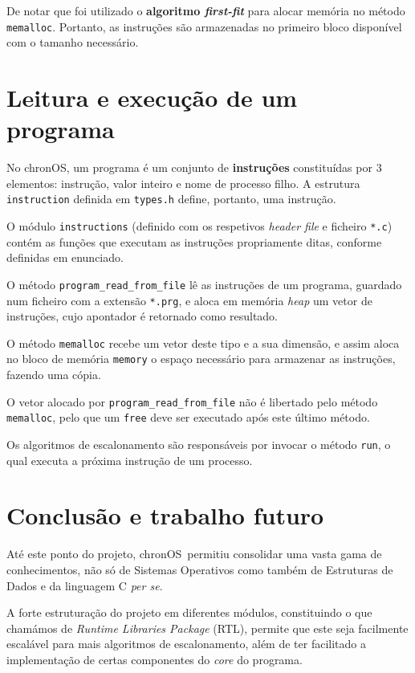 \documentclass[a4paper,11pt,onecolumn,oneside]{article}
\newcommand{\chronOS}{\textsf{chronOS}}
\begin{document}
	De notar que foi utilizado o \textbf{algoritmo \textit{first-fit}} para alocar memória no método \verb|memalloc|. Portanto, as instruções são armazenadas no primeiro bloco disponível com o tamanho necessário.
	
	
	\section{Leitura e execução de um programa}
	\label{sec:program}
	
	No \chronOS, um programa é um conjunto de \textbf{instruções} constituídas por 3 elementos: instrução, valor inteiro e nome de processo filho. A estrutura \verb|instruction| definida em \verb|types.h| define, portanto, uma instrução.
	
	O módulo \texttt{instructions} (definido com os respetivos \textit{header file} e ficheiro \verb|*.c|) contém as funções que executam as instruções propriamente ditas, conforme definidas em enunciado.
	
	O método \verb|program_read_from_file| lê as instruções de um programa, guardado num ficheiro com a extensão \verb|*.prg|, e aloca em memória \textit{heap} um vetor de instruções, cujo apontador é retornado como resultado.
	
	O método \verb|memalloc| recebe um vetor deste tipo e a sua dimensão, e assim aloca no bloco de memória \verb|memory| o espaço necessário para armazenar as instruções, fazendo uma cópia.
	
	O vetor alocado por \verb|program_read_from_file| não é libertado pelo método \verb|memalloc|, pelo que um \verb|free| deve ser executado após este último método.
	
	Os algoritmos de escalonamento são responsáveis por invocar o método \verb|run|, o qual executa a próxima instrução de um processo.
	
	
	\section{Conclusão e trabalho futuro}
	\label{sec:con_futwork}
	
	Até este ponto do projeto, \chronOS~permitiu consolidar uma vasta gama de conhecimentos, não só de Sistemas Operativos como também de Estruturas de Dados e da linguagem C \textit{per se}.
	
	A forte estruturação do projeto em diferentes módulos, constituindo o que chamámos de \textit{Runtime Libraries Package} (RTL), permite que este seja facilmente escalável para mais algoritmos de escalonamento, além de ter facilitado a implementação de certas componentes do \textit{core} do programa.
	
\end{document}
